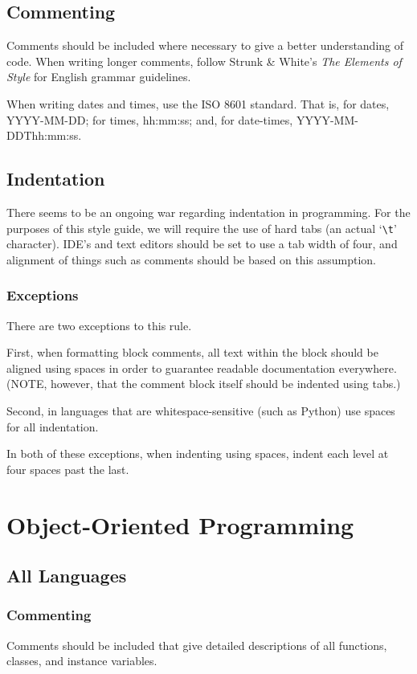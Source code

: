 \documentclass[12pt,letter]{memoir} %
\begin{document}
	\section{Commenting}
		Comments should be included where necessary to give a better
		understanding of code. When writing longer comments, follow Strunk \&
		White's \emph{The Elements of Style} for English grammar guidelines.
		
		When writing dates and times, use the ISO 8601 standard. That is, for
		dates, YYYY-MM-DD; for times, hh:mm:ss; and, for date-times,
		YYYY-MM-DDThh:mm:ss.
	
	\section{Indentation}
		There seems to be an ongoing war regarding indentation in programming.
		For the purposes of this style guide, we will require the use of hard
		tabs (an actual `\texttt{{\textbackslash}t}' character). IDE's and text
		editors should be set to use a tab width of four, and alignment of
		things such as comments should be based on this assumption.

		\subsection{Exceptions}
			There are two exceptions to this rule.

			First, when formatting block comments, all text within the block
			should be aligned using spaces in order to guarantee readable
			documentation everywhere. (NOTE, however, that the comment block
			itself should be indented using tabs.)
			
			Second, in languages that are whitespace-sensitive (such as Python)
			use spaces for all indentation.
			
			In both of these exceptions, when indenting using spaces, indent
			each level at four spaces past the last.

\chapter{Object-Oriented Programming}
	\section{All Languages}
		\subsection{Commenting}
			Comments should be included that give detailed descriptions of all
			functions, classes, and instance variables.
		
\end{document}
